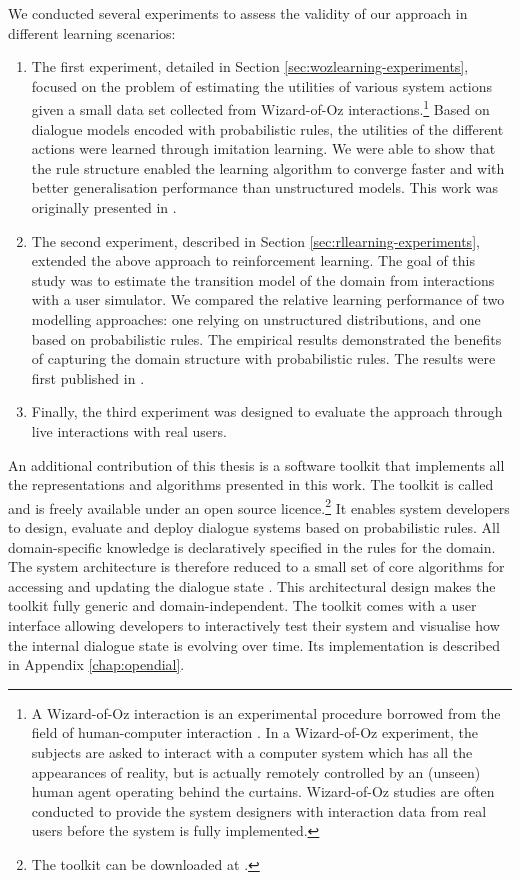 We conducted several experiments to assess the validity of our approach in different learning scenarios: \begin{enumerate}
\item The first experiment, detailed in Section \ref{sec:wozlearning-experiments}, focused on the problem of estimating the utilities of various system actions given a small data set collected from Wizard-of-Oz interactions.\footnote{A Wizard-of-Oz interaction is an experimental procedure borrowed from the field of human-computer interaction \citep{woz93}. In a Wizard-of-Oz experiment, the subjects are asked to interact with a computer system which has all the appearances of reality, but is actually remotely controlled by an (unseen) human agent operating behind the curtains.  Wizard-of-Oz studies are often conducted to provide the system designers with interaction data from real users before the system is fully implemented.}  Based on dialogue models encoded with probabilistic rules, the utilities of the different actions were learned through imitation learning. We were able to show that the rule structure enabled the learning algorithm to converge faster and with better generalisation performance than unstructured models. This work was originally presented in \citep{rulebasedmodels-sigdial2012}. 
\item The second experiment, described in Section \ref{sec:rllearning-experiments}, extended the above approach to reinforcement learning. The goal of this study was to estimate the transition model of the domain from interactions with a user simulator. We compared the relative learning performance of two modelling approaches: one relying on unstructured distributions, and one based on probabilistic rules. The empirical results demonstrated the benefits of capturing the domain structure with probabilistic rules. The results were first published in \citep{interspeech2013}. 
\item Finally, the third experiment was designed to evaluate the approach through live interactions with real users.   
\end{enumerate}

An additional contribution of this thesis is a software toolkit that implements all the representations and algorithms presented in this work. The toolkit is called \opendial  and is freely available under an open source licence.\footnote{The toolkit can be downloaded at .} It enables system developers to design, evaluate and deploy dialogue systems based on probabilistic rules. 
All domain-specific knowledge is declaratively specified in the rules for the domain. The system architecture is therefore reduced to a small set of core algorithms for accessing and updating the dialogue state \citep{lison-semdial2012}. This architectural design makes the toolkit fully generic and domain-independent. The \opendial  toolkit comes with a user interface allowing developers to interactively test their system and visualise how the internal dialogue state is evolving over time.  Its implementation is described in Appendix \ref{chap:opendial}. 

